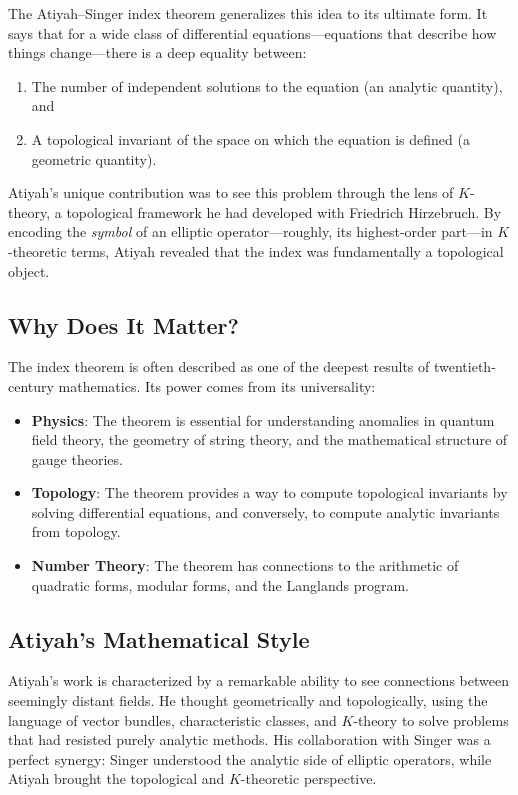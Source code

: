 The Atiyah--Singer index theorem generalizes this idea to its ultimate form. It says that for a wide class of differential equations---equations that describe how things change---there is a deep equality between:
\begin{enumerate}
\item The number of independent solutions to the equation (an analytic quantity), and
\item A topological invariant of the space on which the equation is defined (a geometric quantity).
\end{enumerate}

Atiyah's unique contribution was to see this problem through the lens of $K$-theory, a topological framework he had developed with Friedrich Hirzebruch. By encoding the \emph{symbol} of an elliptic operator---roughly, its highest-order part---in $K$-theoretic terms, Atiyah revealed that the index was fundamentally a topological object.

\subsection{Why Does It Matter?}

The index theorem is often described as one of the deepest results of twentieth-century mathematics. Its power comes from its universality:
\begin{itemize}
\item \textbf{Physics}: The theorem is essential for understanding anomalies in quantum field theory, the geometry of string theory, and the mathematical structure of gauge theories.
\item \textbf{Topology}: The theorem provides a way to compute topological invariants by solving differential equations, and conversely, to compute analytic invariants from topology.
\item \textbf{Number Theory}: The theorem has connections to the arithmetic of quadratic forms, modular forms, and the Langlands program.
\end{itemize}

\subsection{Atiyah's Mathematical Style}

Atiyah's work is characterized by a remarkable ability to see connections between seemingly distant fields. He thought geometrically and topologically, using the language of vector bundles, characteristic classes, and $K$-theory to solve problems that had resisted purely analytic methods. His collaboration with Singer was a perfect synergy: Singer understood the analytic side of elliptic operators, while Atiyah brought the topological and $K$-theoretic perspective.

